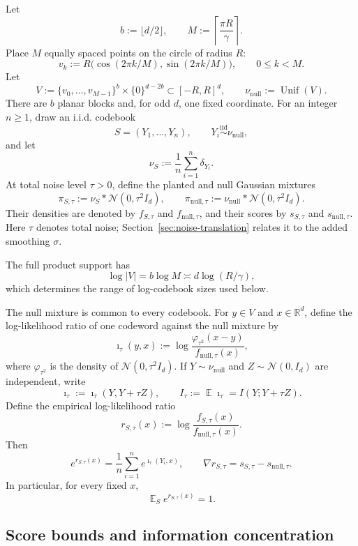\documentclass[11pt,letterpaper]{article}
\newcommand{\R}{\mathbb{R}}
\DeclareMathOperator*{\E}{\mathbb{E}}
\newcommand{\1}{\mathbbm{1}}
\DeclareMathOperator{\Unif}{Unif}
\newcommand{\cN}{\mathcal N}
\begin{document}
Let
\[
   b:=\lfloor d/2\rfloor,
   \qquad
   M:=\left\lceil\frac{\pi R}{\gamma}\right\rceil.
\]
Place \(M\) equally spaced points on the circle of radius \(R\):
\[
   v_k:=R\bigl(\cos(2\pi k/M),\sin(2\pi k/M)\bigr),
   \qquad 0\le k<M.
\]
Let
\[
   V:=\{v_0,\ldots,v_{M-1}\}^{b}
      \times\{0\}^{d-2b}
      \subset[-R,R]^d,
   \qquad
   \nu_{\mathrm{null}}:=\Unif(V).
\]
There are \(b\) planar blocks and, for odd \(d\), one fixed coordinate.
For an integer \(n\ge1\), draw an i.i.d. codebook
\[
   S=(Y_1,\ldots,Y_n),
   \qquad Y_i\stackrel{\mathrm{iid}}\sim\nu_{\mathrm{null}},
\]
and let
\[
   \nu_S:=\frac1n\sum_{i=1}^n\delta_{Y_i}.
\]
At total noise level \(\tau>0\), define the planted and null
Gaussian mixtures
\[
   \pi_{S,\tau}:=\nu_S*\cN(0,\tau^2I_d),
   \qquad
   \pi_{\mathrm{null},\tau}
   :=\nu_{\mathrm{null}}*\cN(0,\tau^2I_d).
\]
Their densities are denoted by \(f_{S,\tau}\) and
\(f_{\mathrm{null},\tau}\), and their scores by \(s_{S,\tau}\) and
\(s_{\mathrm{null},\tau}\).  Here \(\tau\) denotes total noise;
Section~\ref{sec:noise-translation} relates it to the added smoothing
\(\sigma\).

The full product support has
\[
   \log|V|=b\log M
          \asymp d\log(R/\gamma),
\]
which determines the range of log-codebook sizes used below.

The null mixture is common to every codebook.  For
\(y\in V\) and \(x\in\R^d\), define the log-likelihood ratio of one
codeword against the null mixture by
\[
   \imath_\tau(y,x)
   :=\log\frac{\varphi_{\tau^2}(x-y)}
                   {f_{\mathrm{null},\tau}(x)},
\]
where \(\varphi_{\tau^2}\) is the density of
\(\cN(0,\tau^2I_d)\).  If \(Y\sim\nu_{\mathrm{null}}\) and
\(Z\sim\cN(0,I_d)\) are independent, write
\[
   \imath_\tau:=\imath_\tau(Y,Y+\tau Z),
   \qquad
   I_\tau:=\E\imath_\tau=I(Y;Y+\tau Z).
\]
Define the empirical log-likelihood ratio
\[
   r_{S,\tau}(x)
   :=\log\frac{f_{S,\tau}(x)}{f_{\mathrm{null},\tau}(x)}.
\]
Then
\begin{equation}\label{eq:empirical-likelihood}
   e^{r_{S,\tau}(x)}
   =\frac1n\sum_{i=1}^n e^{\imath_\tau(Y_i,x)},
   \qquad
   \nabla r_{S,\tau}=s_{S,\tau}-s_{\mathrm{null},\tau}.
\end{equation}
In particular, for every fixed \(x\),
\begin{equation}\label{eq:mean-empirical-likelihood}
   \E_S e^{r_{S,\tau}(x)}=1.
\end{equation}

\subsection{Score bounds and information concentration}
\end{document}
